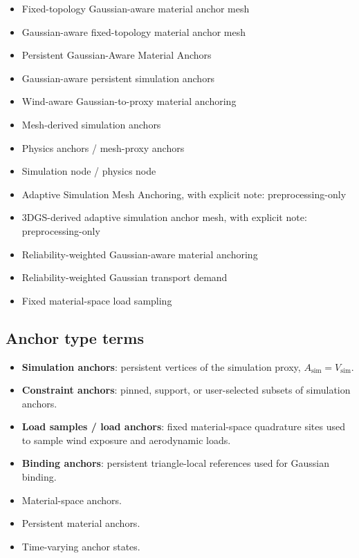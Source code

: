 \documentclass[11pt,a4paper]{article}
\begin{document}
\begin{itemize}[leftmargin=2em]
\item Fixed-topology Gaussian-aware material anchor mesh
\item Gaussian-aware fixed-topology material anchor mesh
\item Persistent Gaussian-Aware Material Anchors
\item Gaussian-aware persistent simulation anchors
\item Wind-aware Gaussian-to-proxy material anchoring
\item Mesh-derived simulation anchors
\item Physics anchors / mesh-proxy anchors
\item Simulation node / physics node
\item Adaptive Simulation Mesh Anchoring, with explicit note: preprocessing-only
\item 3DGS-derived adaptive simulation anchor mesh, with explicit note: preprocessing-only
\item Reliability-weighted Gaussian-aware material anchoring
\item Reliability-weighted Gaussian transport demand
\item Fixed material-space load sampling
\end{itemize}

\subsection{Anchor type terms}

\begin{itemize}[leftmargin=2em]
\item \textbf{Simulation anchors}: persistent vertices of the simulation proxy, $A_{\mathrm{sim}}=V_{\mathrm{sim}}$.
\item \textbf{Constraint anchors}: pinned, support, or user-selected subsets of simulation anchors.
\item \textbf{Load samples / load anchors}: fixed material-space quadrature sites used to sample wind exposure and aerodynamic loads.
\item \textbf{Binding anchors}: persistent triangle-local references used for Gaussian binding.
\item Material-space anchors.
\item Persistent material anchors.
\item Time-varying anchor states.
\end{itemize}
\end{document}
